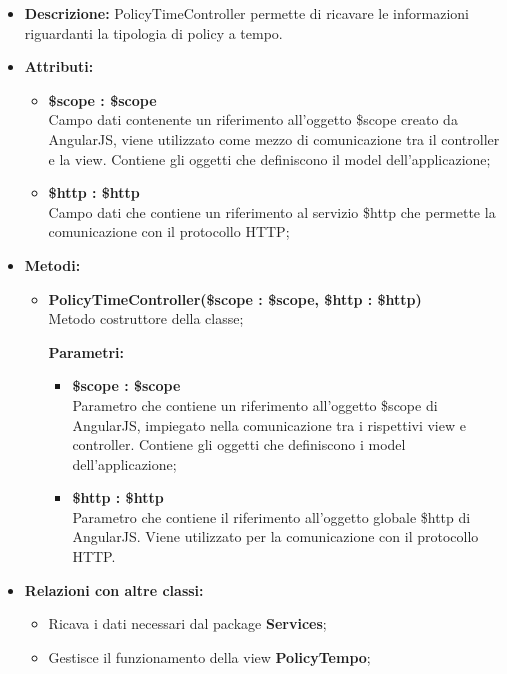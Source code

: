 \begin{itemize}
	\item \textbf{Descrizione:} PolicyTimeController permette di ricavare le informazioni riguardanti la tipologia di policy a tempo.
	\item \textbf{Attributi:}
	\begin{itemize}
		
		\item \textbf{\$scope : \$scope}\\
		Campo dati contenente un riferimento all'oggetto \$scope creato da AngularJS, viene utilizzato come mezzo di comunicazione tra il controller e la view. Contiene gli oggetti che definiscono il model dell'applicazione;
		
		\item \textbf{\$http : \$http }\\
		Campo dati che contiene un riferimento al servizio \$http che permette la comunicazione con il protocollo HTTP;
		
	\end{itemize}
	\item \textbf{Metodi:}
	\begin{itemize}
		
		\item \textbf{PolicyTimeController(\$scope : \$scope, \$http : \$http)}\\
		Metodo costruttore della classe;
		\begin{description}
			\item[\textbf{Parametri:}]
		\end{description}
		\begin{itemize}
			\item \textbf{\$scope : \$scope}\\
			Parametro che contiene un riferimento all'oggetto \$scope di AngularJS, impiegato nella comunicazione tra i rispettivi view e controller. Contiene gli oggetti che definiscono i model dell'applicazione;
			
			\item \textbf{\$http : \$http}\\
			Parametro che contiene il riferimento all'oggetto globale \$http di AngularJS. Viene utilizzato per la comunicazione con il protocollo HTTP.
			
		\end{itemize}				
	\end{itemize}
	\item \textbf{Relazioni con altre classi:}
	\begin{itemize}
		\item Ricava i dati necessari dal package \textbf{Services};
		\item Gestisce il funzionamento della view \textbf{PolicyTempo};
	\end{itemize}
\end{itemize}

